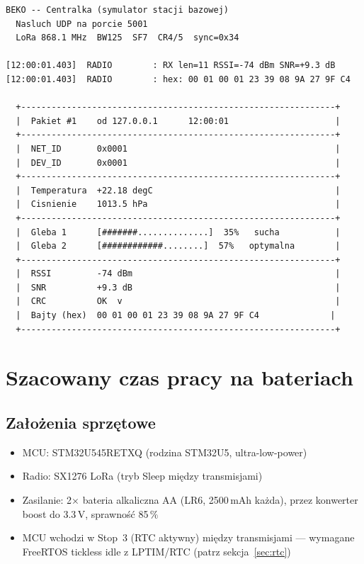 \documentclass[12pt,a4paper]{article}
\newcommand{\qty}[2]{#1\,\ensuremath{#2}}
\newcommand{\milli}{\mathrm{m}}
\newcommand{\ampere}{\mathrm{A}}
\newcommand{\volt}{\mathrm{V}}
\newcommand{\hour}{\mathrm{h}}
\newcommand{\percent}{\%}
\begin{document}
\begin{lstlisting}[basicstyle=\ttfamily\scriptsize, frame=single,
                   caption={Wyjście terminala centralki (symulator Python)}]
  BEKO -- Centralka (symulator stacji bazowej)
  Nasluch UDP na porcie 5001
  LoRa 868.1 MHz  BW125  SF7  CR4/5  sync=0x34

[12:00:01.403]  RADIO        : RX len=11 RSSI=-74 dBm SNR=+9.3 dB
[12:00:01.403]  RADIO        : hex: 00 01 00 01 23 39 08 9A 27 9F C4

  +--------------------------------------------------------------+
  |  Pakiet #1    od 127.0.0.1      12:00:01                     |
  +--------------------------------------------------------------+
  |  NET_ID       0x0001                                         |
  |  DEV_ID       0x0001                                         |
  +--------------------------------------------------------------+
  |  Temperatura  +22.18 degC                                    |
  |  Cisnienie    1013.5 hPa                                     |
  +--------------------------------------------------------------+
  |  Gleba 1      [#######..............]  35%   sucha           |
  |  Gleba 2      [############........]  57%   optymalna        |
  +--------------------------------------------------------------+
  |  RSSI         -74 dBm                                        |
  |  SNR          +9.3 dB                                        |
  |  CRC          OK  v                                          |
  |  Bajty (hex)  00 01 00 01 23 39 08 9A 27 9F C4              |
  +--------------------------------------------------------------+
\end{lstlisting}

\section{Szacowany czas pracy na bateriach}

\subsection{Założenia sprzętowe}

\begin{itemize}[noitemsep]
  \item MCU: STM32U545RETXQ (rodzina STM32U5, ultra-low-power)
  \item Radio: SX1276 LoRa (tryb Sleep między transmisjami)
  \item Zasilanie: 2$\times$ bateria alkaliczna AA (LR6, \qty{2500}{\milli\ampere\hour} każda),
        przez konwerter boost do \qty{3.3}{\volt}, sprawność \qty{85}{\percent}
  \item MCU wchodzi w Stop~3 (RTC aktywny) między transmisjami — wymagane
        FreeRTOS tickless idle z LPTIM/RTC (patrz sekcja~\ref{sec:rtc})
\end{itemize}
\end{document}
